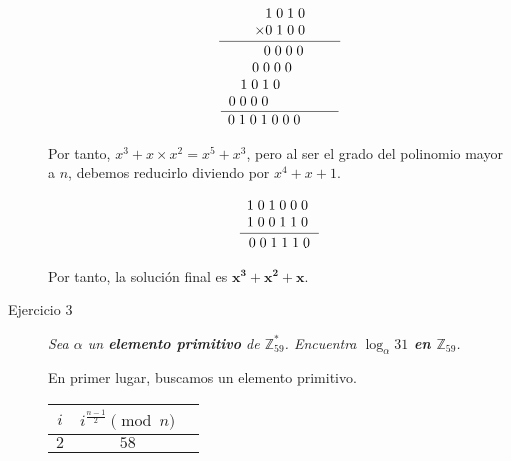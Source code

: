 \documentclass[10pt,spanish]{article}
\begin{document}
\begin{description}
    \begin{displaymath}
        \frac{
            \begin{array}[b]{r}
            1\; 0\; 1\; 0 \\
            \times 0\; 1\; 0\; 0
            \end{array}
        }{\frac{
            \begin{array}[b]{r}
                0\; 0\; 0\; 0 \;\;\;\;\;\;\;\\
                0\; 0\; 0\; 0\; \;\;\;\;\;\;\;\;\;\\
                1\; 0\; 1\; 0\; \;\;\;\;\;\;\;\;\;\;\;\;\\
                0\; 0\; 0\; 0\; \;\;\;\;\;\;\;\;\;\;\;\;\;\;\;
            \end{array}
        }{
        \begin{array}[b]{r}
        0\; 1\; 0\; 1\; 0\; 0\; 0\; \;\;\;\;\;\;\;
        \end{array}
        }}
    \end{displaymath}

    Por tanto, $x^3 + x \times x^2 = x^5 + x^3$, pero al ser el grado del polinomio mayor a $n$, debemos reducirlo diviendo por $x^4 + x + 1$.

    \begin{displaymath}
        \frac{
            \begin{array}[b]{r}
                1\; 0\; 1\; 0\; 0\; 0\;\\
                1\; 0\; 0\; 1\; 1\; 0\;
            \end{array}
        }{
            \begin{array}[b]{r}
                0\; 0\; 1\; 1\; 1\; 0
            \end{array}
        }
    \end{displaymath}

    Por tanto, la solución final es \textcolor{morado}{$\mathbf{x^3 + x^2 + x}$}.

    \item[Ejercicio 3] \textit{Sea $\alpha$ un \textbf{\textcolor{morado}{elemento primitivo}} de $\mathbb{Z}_{59}^*$. Encuentra \textbf{\textcolor{morado}{$\log_{\alpha} 31$ en $\mathbb{Z}_{59}$}}.}

    En primer lugar, buscamos un elemento primitivo.

    \begin{center}
    \begin{tabular}{c | c | c}
    $i$ & $i^{\frac{n-1}{2}} \pmod n$ \\
    \hline
    $2$ & $58$  
    \end{tabular}
    \end{center}


\end{description}
\end{document}
